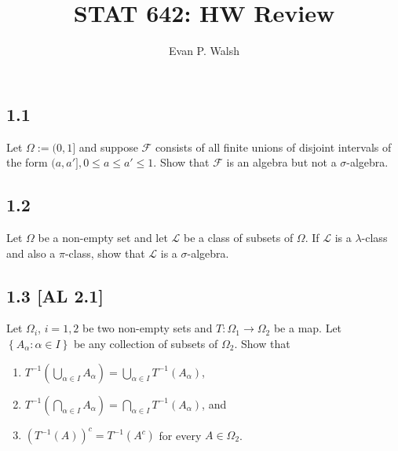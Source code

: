 \documentclass[12pt]{article}
\title{STAT 642: HW Review}
\author{Evan P. Walsh}
\begin{document}

\def\cp{\stackrel{p}{\rightarrow}}
\def\as{\stackrel{\text{a.s.}}{\longrightarrow}}

\subsection*{1.1}
\begin{tcolorbox}
Let $\Omega := (0,1]$ and suppose $\mathcal{F}$ consists of all finite unions of disjoint intervals of the form $(a,a'], 0 \leq a \leq a' \leq 1$.
Show that $\mathcal{F}$ is an algebra but not a $\sigma$-algebra.
\end{tcolorbox}



\subsection*{1.2}
\begin{tcolorbox}
Let $\Omega$ be a non-empty set and let $\mathcal{L}$ be a class of subsets of $\Omega$. If $\mathcal{L}$ is a $\lambda$-class and also a $\pi$-class,
show that $\mathcal{L}$ is a $\sigma$-algebra.
\end{tcolorbox}




\subsection*{1.3 [AL 2.1]}
\begin{tcolorbox}
Let $\Omega_{i}$, $i = 1,2$ be two non-empty sets and $T : \Omega_{1} \rightarrow \Omega_{2}$ be a map. Let $\left\{ A_{\alpha} : \alpha \in I
\right\}$ be any collection of subsets of $\Omega_{2}$. Show that
\begin{enumerate}[label=(\alph*)]
\item $T^{-1}\left( \bigcup_{\alpha \in I}A_{\alpha} \right) = \bigcup_{\alpha\in I}T^{-1}(A_{\alpha})$, \\

\item $T^{-1}\left( \bigcap_{\alpha \in I} A_\alpha \right) = \bigcap_{\alpha \in I}T^{-1}(A_\alpha)$, and  \\

\item $\left( T^{-1}(A) \right)^{c} = T^{-1}(A^{c})$ for every $A \in \Omega_2$.
\end{enumerate}
\end{tcolorbox}
\end{document}
